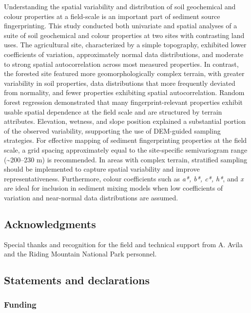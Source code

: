 \documentclass[
  number]{elsarticle}
\begin{document}
Understanding the spatial variability and distribution of soil
geochemical and colour properties at a field-scale is an important part
of sediment source fingerprinting. This study conducted both univariate
and spatial analyses of a suite of soil geochemical and colour
properties at two sites with contrasting land uses. The agricultural
site, characterized by a simple topography, exhibited lower coefficients
of variation, approximately normal data distributions, and moderate to
strong spatial autocorrelation across most measured properties. In
contrast, the forested site featured more geomorphologically complex
terrain, with greater variability in soil properties, data distributions
that more frequently deviated from normality, and fewer properties
exhibiting spatial autocorrelation. Random forest regression
demonstrated that many fingerprint-relevant properties exhibit usable
spatial dependence at the field scale and are structured by terrain
attributes. Elevation, wetness, and slope position explained a
substantial portion of the observed variability, ssupporting the use of
DEM-guided sampling strategies. For effective mapping of sediment
fingerprinting properties at the field scale, a grid spacing
approximately equal to the site-specific semivariogram range
(\textasciitilde200--230 m) is recommended. In areas with complex
terrain, stratified sampling should be implemented to capture spatial
variability and improve representativeness. Furthermore, colour
coefficients such as \emph{a*, b*, c*, h*}, and \emph{x} are ideal for
inclusion in sediment mixing models when low coefficients of variation
and near-normal data distributions are assumed.

\subsection*{Acknowledgments}\label{acknowledgments}

Special thanks and recognition for the field and technical support from
A. Avila and the Riding Mountain National Park personnel.

\subsection*{Statements and
declarations}\label{statements-and-declarations}

\subsubsection*{Funding}\label{funding}
\end{document}
